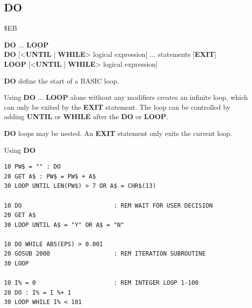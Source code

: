 
\newpage
\subsection{DO}
\begin{description}[leftmargin=2cm,style=nextline]
\item [Token:]    \$EB

\item [Format:]   {\bf DO} ... {\bf LOOP} \\
                  {\bf DO} [<{\bf UNTIL} | {\bf WHILE}> logical expression] ... statements [{\bf EXIT}] \\
                  {\bf LOOP} [<{\bf UNTIL} | {\bf WHILE}> logical expression]

\item [Usage:]    {\bf DO} define the start of a BASIC loop.

                  Using {\bf DO} ... {\bf LOOP} alone without any modifiers creates an infinite loop, which can only be exited by the {\bf EXIT} statement. The loop can be controlled by adding {\bf UNTIL} or {\bf WHILE} after the {\bf DO} or {\bf LOOP}.

\item [Remarks:]  {\bf DO} loops may be nested. An {\bf EXIT} statement only exits the current loop.

\item [Examples:] Using {\bf DO}

\begin{tcolorbox}[colback=black,coltext=white]
\verbatimfont{\codefont}
\begin{verbatim}
10 PW$ = "" : DO
20 GET A$ : PW$ = PW$ + A$
30 LOOP UNTIL LEN(PW$) > 7 OR A$ = CHR$(13)

10 DO                          : REM WAIT FOR USER DECISION
20 GET A$
30 LOOP UNTIL A$ = "Y" OR A$ = "N"

10 DO WHILE ABS(EPS) > 0.001
20 GOSUB 2000                  : REM ITERATION SUBROUTINE
30 LOOP

10 I% = 0                      : REM INTEGER LOOP 1-100
20 DO : I% = I %+ 1
30 LOOP WHILE I% < 101
\end{verbatim}
\end{tcolorbox}
\end{description}


\newpage
